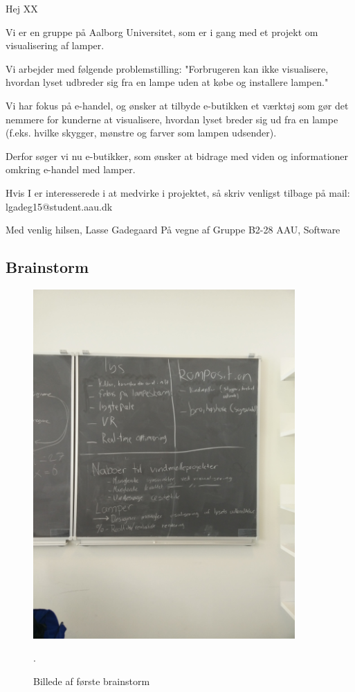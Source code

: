 \documentclass[oneside,a4paper,titlepage]{article}
\begin{document}
\begin{itemize}
Hej XX
 
Vi er en gruppe på Aalborg Universitet, som er i gang med et projekt om visualisering af lamper.
 
Vi arbejder med følgende problemstilling:
"Forbrugeren kan ikke visualisere, hvordan lyset udbreder sig fra en lampe uden at købe og installere lampen." 

Vi har fokus på e-handel, og ønsker at tilbyde e-butikken et værktøj som gør det nemmere for kunderne at visualisere, hvordan lyset breder sig ud fra en lampe (f.eks. hvilke skygger, mønstre og farver som lampen udsender). 

Derfor søger vi nu e-butikker, som ønsker at bidrage med viden og informationer omkring e-handel med lamper.  

Hvis I er interesserede i at medvirke i projektet, så skriv venligst tilbage på mail: lgadeg15@student.aau.dk 

Med venlig hilsen,\newline
Lasse Gadegaard\newline
På vegne af\newline
Gruppe B2-28\newline
AAU, Software

\subsection{Brainstorm}
\begin{figure}[H]
   \centering
   \includegraphics[width=10cm]{graphics/brainstorm_1}
   \caption{Billede af første brainstorm}.
\end{figure}


\end{itemize}
\end{document}
